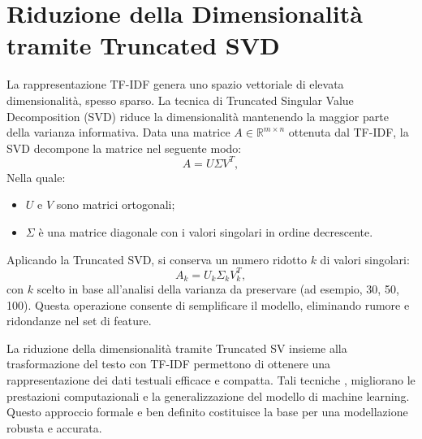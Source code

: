 \section{Riduzione della Dimensionalità tramite Truncated SVD}
La rappresentazione TF-IDF genera uno spazio vettoriale di elevata dimensionalità, spesso sparso. La tecnica di Truncated Singular Value Decomposition (SVD) riduce la dimensionalità mantenendo la maggior parte della varianza informativa. Data una matrice \(A \in \mathbb{R}^{m \times n}\) ottenuta dal TF-IDF, la SVD decompone la matrice nel seguente modo:
\[
A = U \Sigma V^T,
\]
Nella quale:
\begin{itemize}
    \item \(U\) e \(V\) sono matrici ortogonali;
    \item \(\Sigma\) è una matrice diagonale con i valori singolari in ordine decrescente.
\end{itemize}
Aplicando la Truncated SVD, si conserva un numero ridotto \(k\) di valori singolari:
\[
A_k = U_k \Sigma_k V_k^T,
\]
con \(k\) scelto in base all'analisi della varianza da preservare (ad esempio, 30, 50, 100). Questa operazione consente di semplificare il modello, eliminando rumore e ridondanze nel set di feature.



La riduzione della dimensionalità tramite Truncated SV insieme alla trasformazione del testo con TF-IDF permettono di ottenere una rappresentazione dei dati testuali efficace e compatta. Tali tecniche , migliorano le prestazioni computazionali e la generalizzazione del modello di machine learning. Questo approccio formale e ben definito costituisce la base per una modellazione robusta e accurata.